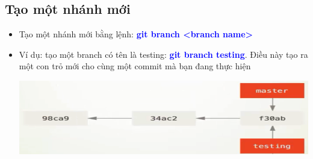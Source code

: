 \documentclass[12pt,a4paper]{report}
\begin{document}
\subsection{Tạo một nhánh mới}
\begin{itemize}
\item Tạo một nhánh mới bằng lệnh: \textcolor{blue}{\bf git branch <branch name>}
\item Ví dụ: tạo một branch có tên là testing: \textcolor{blue}{\bf git branch testing}. Điều này tạo ra một con trỏ mới cho cùng một commit mà bạn đang thực hiện

	\includegraphics[width=0.8\linewidth]{screenshot051}

	\label{fig:screenshot051}

\end{itemize}
\end{document}
